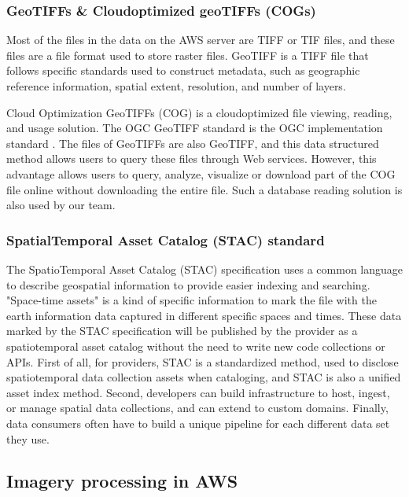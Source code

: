 \documentclass[conference]{IEEEtran}
\begin{document}
\subsubsection{GeoTIFFs \& Cloud\-optimized geoTIFFs (COGs)}

Most of the files in the data on the AWS server are TIFF or TIF files, and these files are a file format used to 
store raster files. GeoTIFF is a TIFF file that follows specific standards used to construct metadata, such as geographic 
reference information, spatial extent, resolution, and number of layers.

Cloud Optimization GeoTIFFs (COG) is a cloud\-optimized file viewing, reading, and usage solution. The OGC GeoTIFF standard 
is the OGC implementation standard \cite{NASA23:online}. The files of GeoTIFFs are also GeoTIFF, and this data structured 
method allows users to query these files through Web services. However, this advantage allows users to query, analyze, visualize 
or download part of the COG file online without downloading the entire file. Such a database reading solution is also used by our team.

\subsubsection{Spatial\-Temporal Asset Catalog (STAC) standard}

The SpatioTemporal Asset Catalog (STAC) specification uses a common language to describe geospatial information to provide easier indexing and searching\cite{SpatioTe21:online}. "Space-time assets" is a kind of specific information to mark the file with the earth information data captured in different specific spaces and times. These data marked by the STAC specification will be published by the provider as a spatiotemporal asset catalog without the need to write new code collections or APIs. First of all, for providers, STAC is a standardized method, used to disclose spatiotemporal data collection assets when cataloging, and STAC is also a unified asset index method. Second, developers can build infrastructure to host, ingest, or manage spatial data collections, and can extend to custom domains. Finally, data consumers often have to build a unique pipeline for each different data set they use.


\subsection{Imagery processing in AWS}
\end{document}
